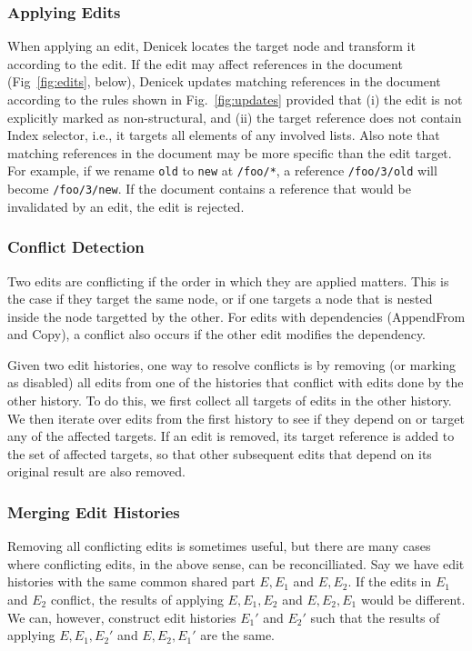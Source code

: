\documentclass[sigconf]{acmart}
\newcommand{\ident}[1]{{\sffamily #1}}
\begin{document}
\subsubsection*{Applying Edits}
When applying an edit, Denicek locates the target node and transform it according to the
edit. If the edit may affect references in the document (Fig~\ref{fig:edits}, below), Denicek
updates matching references in the document according to the rules shown in Fig.~\ref{fig:updates}
provided that (i) the edit is not explicitly marked as non-structural, and (ii) the target
reference does not contain \ident{Index} selector, i.e., it targets all elements of any involved
lists. Also note that matching references in the document may be more specific than the edit
target. For example, if we rename {\small\Verb|old|} to {\small\Verb|new|} at {\small\Verb|/foo/*|},
a reference {\small\Verb|/foo/3/old|} will become {\small\Verb|/foo/3/new|}. If the document
contains a reference that would be invalidated by an edit, the edit is rejected.

\subsubsection*{Conflict Detection}
Two edits are conflicting if the order in which they are applied matters. This is the case if
they target the same node, or if one targets a node that is nested inside the node targetted by
the other. For edits with dependencies (\ident{AppendFrom} and \ident{Copy}), a conflict also
occurs if the other edit modifies the dependency.

Given two edit histories, one way to resolve conflicts is by removing (or marking as disabled) all
edits from one of the histories that conflict with edits done by the other history. To do this,
we first collect all targets of edits in the other history. We then iterate over edits from the first
history to see if they depend on or target any of the affected targets. If an edit is removed,
its target reference is added to the set of affected targets, so that other subsequent edits that depend
on its original result are also removed.

\subsubsection*{Merging Edit Histories}
Removing all conflicting edits is sometimes useful, but there are many cases where conflicting
edits, in the above sense, can be reconcilliated. Say we have edit histories with
the same common shared part $E, E_1$ and $E, E_2$. If the edits in $E_1$ and $E_2$ conflict,
the results of applying $E, E_1, E_2$ and $E, E_2, E_1$ would be different. We can, however,
construct edit histories $E_1'$ and $E_2'$ such that the results of applying $E, E_1, E_2'$ and
$E, E_2, E_1'$ are the same.
\end{document}
